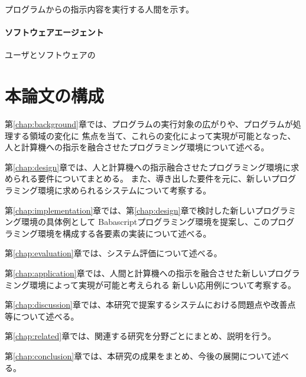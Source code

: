 プログラムからの指示内容を実行する人間を示す。

\paragraph{ソフトウェアエージェント}\label{ux30bdux30d5ux30c8ux30a6ux30a7ux30a2ux30a8ux30fcux30b8ux30a7ux30f3ux30c8}

ユーザとソフトウェアの

\section{本論文の構成}\label{ux672cux8ad6ux6587ux306eux69cbux6210}

第\ref{chap:background}章では、プログラムの実行対象の広がりや、プログラムが処理する領域の変化に
焦点を当て、これらの変化によって実現が可能となった、人と計算機への指示を融合させたプログラミング環境について述べる。

第\ref{chap:design}章では、人と計算機への指示融合させたプログラミング環境に求められる要件についてまとめる。
また、導き出した要件を元に、新しいプログラミング環境に求められるシステムについて考察する。

第\ref{chap:implementation}章では、第\ref{chap:design}章で検討した新しいプログラミング環境の具体例として
Babascriptプログラミング環境を提案し、このプログラミング環境を構成する各要素の実装について述べる。

第\ref{chap:evaluation}章では、システム評価について述べる。

第\ref{chap:application}章では、人間と計算機への指示を融合させた新しいプログラミング環境によって実現が可能と考えられる
新しい応用例について考察する。

第\ref{chap:discussion}章では、本研究で提案するシステムにおける問題点や改善点等について述べる。

第\ref{chap:related}章では、関連する研究を分野ごとにまとめ、説明を行う。

第\ref{chap:conclusion}章では、本研究の成果をまとめ、今後の展開について述べる。
